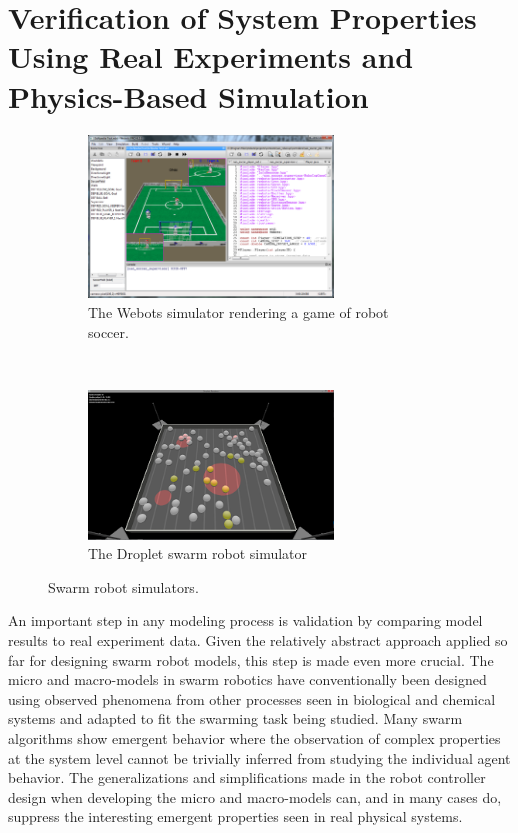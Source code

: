 \documentclass[defaultstyle,12pt]{thesis}
\begin{document}
\section{Verification of System Properties Using Real Experiments and Physics-Based Simulation}
\begin{figure}[!tb]
\begin{subfigure}{.5\textwidth}
\centering\includegraphics[width=6.5cm]{../assets/Webots.png}
\centering\caption{The Webots simulator rendering a game of robot soccer.}\label{fig:webots}
\end{subfigure}~
\begin{subfigure}{.5\textwidth}
\centering\includegraphics[width=6.5cm]{../assets/newsim.png}
\centering\caption{The Droplet swarm robot simulator}\label{fig:dropletsim}
\end{subfigure}
\caption{Swarm robot simulators.}
\end{figure}

An important step in any modeling process is validation by comparing model results to real experiment data. Given the relatively abstract approach applied so far for designing swarm robot models, this step is made even more crucial. The micro and macro-models in swarm robotics have conventionally been designed using observed phenomena from other processes seen in biological and chemical systems and adapted to fit the swarming task being studied. Many swarm algorithms show emergent behavior where the observation of complex properties at the system level cannot be trivially inferred from studying the individual agent behavior. The generalizations and simplifications made in the robot controller design when developing the micro and macro-models can, and in many cases do, suppress the interesting emergent properties seen in real physical systems. 
\end{document}
